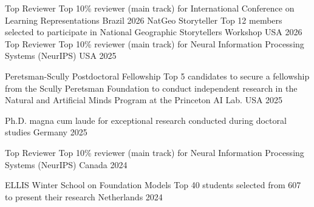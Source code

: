



\begin{cvhonors}

    \cvhonor
    {Top Reviewer} %
    {Top 10\% reviewer (main track) for International Conference on Learning Representations} %
    {Brazil} %
    {2026} %
    \cvhonor
    {NatGeo Storyteller} %
    {Top 12 members selected to participate in National Geographic Storytellers Workshop} %
    {USA} %
    {2026} %
    \cvhonor
    {Top Reviewer} %
    {Top 10\% reviewer (main track) for Neural Information Processing Systems (NeurIPS)} %
    {USA} %
    {2025} %

    \cvhonor
    {Peretsman-Scully Postdoctoral Fellowship} %
    {Top 5 candidates to secure a fellowship from the Scully Peretsman Foundation to conduct independent research in the Natural and Artificial Minds Program at the Princeton AI Lab.} %
    {USA} %
    {2025} %


    \cvhonor
    {Ph.D. magna cum laude} %
    {for exceptional research conducted during doctoral studies} %
    {Germany} %
    {2025} %


    \cvhonor
    {Top Reviewer} %
    {Top 10\% reviewer (main track) for Neural Information Processing Systems (NeurIPS)} %
    {Canada} %
    {2024} %

    
    \cvhonor
    {ELLIS Winter School on Foundation Models} %
    {Top 40 students selected from 607 to present their research} %
    {Netherlands} %
    {2024} %
    

\end{cvhonors}
